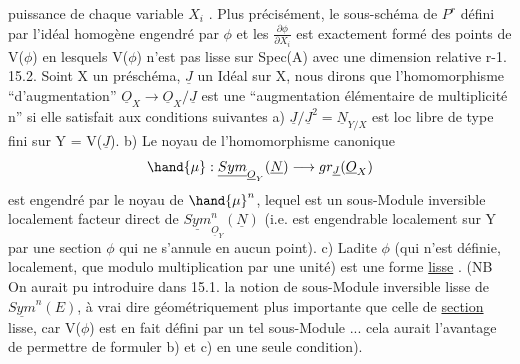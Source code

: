 
puissance de chaque variable $X_i$ . Plus précisément, le sous-schéma
de $P^r$ défini par l'idéal homogène engendré par  $\phi$ et les $\frac{\partial\phi}{\partial X_i}$ est
exactement formé des points de V($\phi$) en lesquels V($\phi$) n'est pas lisse sur
Spec(A) avec une dimension relative r-1.
15.2. Soint X un préschéma, $\underline{J}$ un Idéal   sur X, nous dirons que
l'homomorphisme ``d'augmentation'' $\underline{O}_X \to \underline{O}_X/\underline{J}$ est une ``augmentation
élémentaire de multiplicité n'' si elle satisfait aux conditions suivantes
a) $\underline{J}/\underline{J}^2 = \underline{N}_{Y/X}$ est loc libre de type fini sur Y = V($\underline{J}$).
b) Le noyau de l'homomorphisme canonique
\[ \hand{\mu} : \underline{Sym}_{\underline{O}_Y}(\underline{N}) \longrightarrow gr_{\underline{J}}(\underline{O}_X) \]
est engendré par le noyau  de $\hand{\mu}^n$, lequel est un sous-Module inversible
localement facteur direct de $\underline{Sym}^n_{\underline{O}_Y}(\underline{N})$ (i.e. est engendrable localement
sur Y par une section $\phi$ qui ne s'annule en aucun point).
c) Ladite $\phi$ (qui n'est définie, localement, que modulo multiplication
par une unité) est une forme \uline{lisse} . (NB On aurait pu introduire dans
15.1. la notion de sous-Module inversible lisse de $\underline{Sym}^n(E)$, à vrai dire
géométriquement plus importante que celle de \uline{section} lisse, car V($\phi$) est
en fait défini par un tel sous-Module ... cela aurait l'avantage de
permettre de formuler b) et c) en une seule condition).

